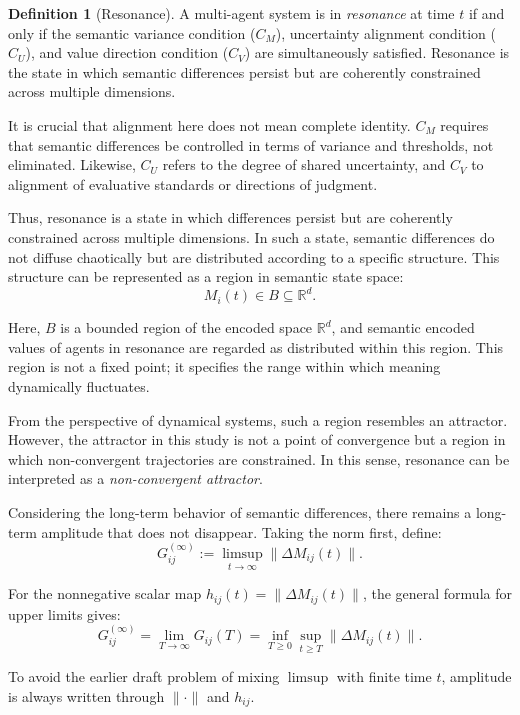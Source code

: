 \documentclass[11pt,a4paper]{article}
\theoremstyle{definition}
\newtheorem{definition}{Definition}[section]
\begin{document}
\begin{definition}[Resonance]
A multi-agent system is in \textit{resonance} at time $t$ if and only if the semantic variance condition ($C_M$), uncertainty alignment condition ($C_U$), and value direction condition ($C_V$) are simultaneously satisfied. Resonance is the state in which semantic differences persist but are coherently constrained across multiple dimensions.
\end{definition}

It is crucial that alignment here does not mean complete identity. $C_M$ requires that semantic differences be controlled in terms of variance and thresholds, not eliminated. Likewise, $C_U$ refers to the degree of shared uncertainty, and $C_V$ to alignment of evaluative standards or directions of judgment.

Thus, resonance is a state in which differences persist but are coherently constrained across multiple dimensions. In such a state, semantic differences do not diffuse chaotically but are distributed according to a specific structure. This structure can be represented as a region in semantic state space:
\[
M_i(t) \in B \subseteq \mathbb{R}^d.
\]

Here, $B$ is a bounded region of the encoded space $\mathbb{R}^d$, and semantic encoded values of agents in resonance are regarded as distributed within this region. This region is not a fixed point; it specifies the range within which meaning dynamically fluctuates.

From the perspective of dynamical systems, such a region resembles an attractor. However, the attractor in this study is not a point of convergence but a region in which non-convergent trajectories are constrained. In this sense, resonance can be interpreted as a \textit{non-convergent attractor}.

Considering the long-term behavior of semantic differences, there remains a long-term amplitude that does not disappear. Taking the norm first, define:
\[
G^{(\infty)}_{ij} := \limsup_{t \to \infty} \|\Delta M_{ij}(t)\|.
\]

For the nonnegative scalar map $h_{ij}(t) = \|\Delta M_{ij}(t)\|$, the general formula for upper limits gives:
\[
G^{(\infty)}_{ij} = \lim_{T \to \infty} G_{ij}(T) = \inf_{T \geq 0} \sup_{t \geq T} \|\Delta M_{ij}(t)\|.
\]

To avoid the earlier draft problem of mixing $\limsup$ with finite time $t$, amplitude is always written through $\|\cdot\|$ and $h_{ij}$.
\end{document}
